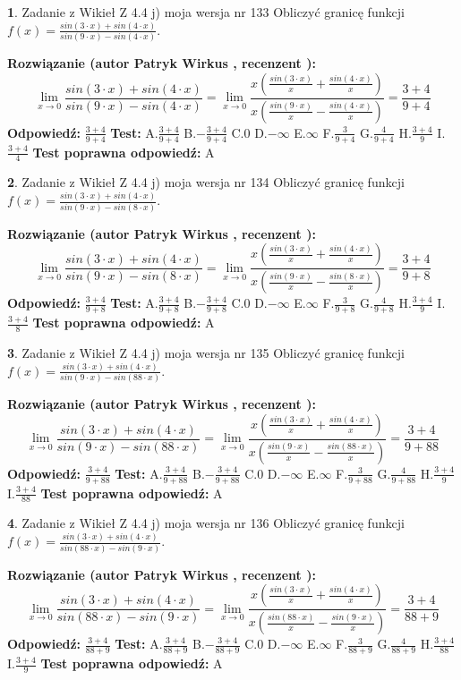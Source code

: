 \documentclass[12pt, a4paper]{article}
\theoremstyle{definition} %
\newtheorem{zad}{}
\newcommand{\zadStart}[1]{\begin{zad}#1\newline}
\newcommand{\zadStop}{\end{zad}}
\newcommand{\rozwStart}[2]{\noindent \textbf{Rozwiązanie (autor #1 , recenzent #2): }\newline}
\newcommand{\rozwStop}{\newline}
\newcommand{\odpStart}{\noindent \textbf{Odpowiedź:}\newline}
\newcommand{\odpStop}{\newline}
\newcommand{\testStart}{\noindent \textbf{Test:}\newline}
\newcommand{\testStop}{\newline}
\newcommand{\kluczStart}{\noindent \textbf{Test poprawna odpowiedź:}\newline}
\newcommand{\kluczStop}{\newline}
\begin{document}
\zadStart{Zadanie z Wikieł Z 4.4 j) moja wersja nr 133}
Obliczyć granicę funkcji $f(x)=\frac{sin(3\cdot x) +sin(4\cdot x)}{sin(9\cdot x) -sin(4\cdot x)}$.
\zadStop
\rozwStart{Patryk Wirkus}{}
$$\lim\limits_{x\to 0}\frac{sin(3\cdot x) +sin(4\cdot x)}{sin(9\cdot x) -sin(4\cdot x)}=\lim\limits_{x\to 0}\frac{x(\frac{sin(3\cdot x)}{x}+\frac{sin(4\cdot x)}{x})}{x(\frac{sin(9\cdot x)}{x}-\frac{sin(4\cdot x)}{x})}=\frac{3+4}{9+4}$$
\rozwStop
\odpStart
$\frac{3+4}{9+4}$
\odpStop
\testStart
A.$\frac{3+4}{9+4}$
B.$-\frac{3+4}{9+4}$
C.$0$
D.$-\infty$
E.$\infty$
F.$\frac{3}{9+4}$
G.$\frac{4}{9+4}$
H.$\frac{3+4}{9}$
I.$\frac{3+4}{4}$
\testStop
\kluczStart
A
\kluczStop



\zadStart{Zadanie z Wikieł Z 4.4 j) moja wersja nr 134}
Obliczyć granicę funkcji $f(x)=\frac{sin(3\cdot x) +sin(4\cdot x)}{sin(9\cdot x) -sin(8\cdot x)}$.
\zadStop
\rozwStart{Patryk Wirkus}{}
$$\lim\limits_{x\to 0}\frac{sin(3\cdot x) +sin(4\cdot x)}{sin(9\cdot x) -sin(8\cdot x)}=\lim\limits_{x\to 0}\frac{x(\frac{sin(3\cdot x)}{x}+\frac{sin(4\cdot x)}{x})}{x(\frac{sin(9\cdot x)}{x}-\frac{sin(8\cdot x)}{x})}=\frac{3+4}{9+8}$$
\rozwStop
\odpStart
$\frac{3+4}{9+8}$
\odpStop
\testStart
A.$\frac{3+4}{9+8}$
B.$-\frac{3+4}{9+8}$
C.$0$
D.$-\infty$
E.$\infty$
F.$\frac{3}{9+8}$
G.$\frac{4}{9+8}$
H.$\frac{3+4}{9}$
I.$\frac{3+4}{8}$
\testStop
\kluczStart
A
\kluczStop



\zadStart{Zadanie z Wikieł Z 4.4 j) moja wersja nr 135}
Obliczyć granicę funkcji $f(x)=\frac{sin(3\cdot x) +sin(4\cdot x)}{sin(9\cdot x) -sin(88\cdot x)}$.
\zadStop
\rozwStart{Patryk Wirkus}{}
$$\lim\limits_{x\to 0}\frac{sin(3\cdot x) +sin(4\cdot x)}{sin(9\cdot x) -sin(88\cdot x)}=\lim\limits_{x\to 0}\frac{x(\frac{sin(3\cdot x)}{x}+\frac{sin(4\cdot x)}{x})}{x(\frac{sin(9\cdot x)}{x}-\frac{sin(88\cdot x)}{x})}=\frac{3+4}{9+88}$$
\rozwStop
\odpStart
$\frac{3+4}{9+88}$
\odpStop
\testStart
A.$\frac{3+4}{9+88}$
B.$-\frac{3+4}{9+88}$
C.$0$
D.$-\infty$
E.$\infty$
F.$\frac{3}{9+88}$
G.$\frac{4}{9+88}$
H.$\frac{3+4}{9}$
I.$\frac{3+4}{88}$
\testStop
\kluczStart
A
\kluczStop



\zadStart{Zadanie z Wikieł Z 4.4 j) moja wersja nr 136}
Obliczyć granicę funkcji $f(x)=\frac{sin(3\cdot x) +sin(4\cdot x)}{sin(88\cdot x) -sin(9\cdot x)}$.
\zadStop
\rozwStart{Patryk Wirkus}{}
$$\lim\limits_{x\to 0}\frac{sin(3\cdot x) +sin(4\cdot x)}{sin(88\cdot x) -sin(9\cdot x)}=\lim\limits_{x\to 0}\frac{x(\frac{sin(3\cdot x)}{x}+\frac{sin(4\cdot x)}{x})}{x(\frac{sin(88\cdot x)}{x}-\frac{sin(9\cdot x)}{x})}=\frac{3+4}{88+9}$$
\rozwStop
\odpStart
$\frac{3+4}{88+9}$
\odpStop
\testStart
A.$\frac{3+4}{88+9}$
B.$-\frac{3+4}{88+9}$
C.$0$
D.$-\infty$
E.$\infty$
F.$\frac{3}{88+9}$
G.$\frac{4}{88+9}$
H.$\frac{3+4}{88}$
I.$\frac{3+4}{9}$
\testStop
\kluczStart
A
\kluczStop
\end{document}
